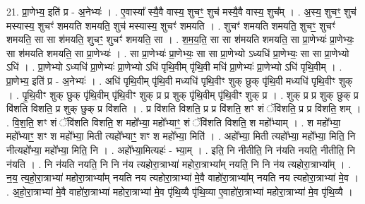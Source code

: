 \documentclass[17pt]{extarticle}
\begin{document}
21. प्रा॒णेभ्य॒ इति॑ प्र - अ॒नेभ्यः॑ । . ए॒वास्या᳚ स्यै॒वै वास्य॒ शुचꣳ॒॒ शुच॑ मस्यै॒वै वास्य॒ शुच᳚म् । . अ॒स्य॒ शुचꣳ॒॒ शुच॑ मस्यास्य॒ शुचꣳ॑ शमयति शमयति॒ शुच॑ मस्यास्य॒ शुचꣳ॑ शमयति । . शुचꣳ॑ शमयति शमयति॒ शुचꣳ॒॒ शुचꣳ॑ शमयति॒ सा सा श॑मयति॒ शुचꣳ॒॒ शुचꣳ॑ शमयति॒ सा । . श॒म॒य॒ति॒ सा सा श॑मयति शमयति॒ सा प्रा॒णेभ्यः॑ प्रा॒णेभ्यः॒ सा श॑मयति शमयति॒ सा प्रा॒णेभ्यः॑ । . सा प्रा॒णेभ्यः॑ प्रा॒णेभ्यः॒ सा सा प्रा॒णेभ्यो ऽध्यधि॑ प्रा॒णेभ्यः॒ सा सा प्रा॒णेभ्यो ऽधि॑ । . प्रा॒णेभ्यो ऽध्यधि॑ प्रा॒णेभ्यः॑ प्रा॒णेभ्यो ऽधि॑ पृथि॒वीम् पृ॑थि॒वी मधि॑ प्रा॒णेभ्यः॑ प्रा॒णेभ्यो ऽधि॑ पृथि॒वीम् । . प्रा॒णेभ्य॒ इति॑ प्र - अ॒नेभ्यः॑ । . अधि॑ पृथि॒वीम् पृ॑थि॒वी मध्यधि॑ पृथि॒वीꣳ शुक् छुक् पृ॑थि॒वी मध्यधि॑ पृथि॒वीꣳ शुक् । . पृ॒थि॒वीꣳ शुक् छुक् पृ॑थि॒वीम् पृ॑थि॒वीꣳ शुक् प्र प्र शुक् पृ॑थि॒वीम् पृ॑थि॒वीꣳ शुक् प्र । . शुक् प्र प्र शुक् छुक् प्र वि॑शति विशति॒ प्र शुक् छुक् प्र वि॑शति । . प्र वि॑शति विशति॒ प्र प्र वि॑शति॒ शꣳ शं ॅवि॑शति॒ प्र प्र वि॑शति॒ शम् । . वि॒श॒ति॒ शꣳ शं ॅवि॑शति विशति॒ श महो᳚भ्या॒ महो᳚भ्याꣳ॒॒ शं ॅवि॑शति विशति॒ श महो᳚भ्याम् । . श महो᳚भ्या॒ महो᳚भ्याꣳ॒॒ शꣳ श महो᳚भ्या॒ मिती त्यहो᳚भ्याꣳ॒॒ शꣳ श महो᳚भ्या॒ मिति॑ । . अहो᳚भ्या॒ मिती त्यहो᳚भ्या॒ महो᳚भ्या॒ मिति॒ नि नीत्यहो᳚भ्या॒ महो᳚भ्या॒ मिति॒ नि । . अहो᳚भ्या॒मित्यहः॑ - भ्या॒म् । . इति॒ नि नीतीति॒ नि न॑यति नयति॒ नीतीति॒ नि न॑यति । . नि न॑यति नयति॒ नि नि न॑य त्यहोरा॒त्राभ्या॑ महोरा॒त्राभ्या᳚म् नयति॒ नि नि न॑य त्यहोरा॒त्राभ्या᳚म् । . न॒य॒ त्य॒हो॒रा॒त्राभ्या॑ महोरा॒त्राभ्या᳚म् नयति नय त्यहोरा॒त्राभ्या॑ मे॒वै वाहो॑रा॒त्राभ्या᳚म् नयति नय त्यहोरा॒त्राभ्या॑ मे॒व । . अ॒हो॒रा॒त्राभ्या॑ मे॒वै वाहो॑रा॒त्राभ्या॑ महोरा॒त्राभ्या॑ मे॒व पृ॑थि॒व्यै पृ॑थि॒व्या ए॒वाहो॑रा॒त्राभ्या॑ महोरा॒त्राभ्या॑ मे॒व पृ॑थि॒व्यै । \newline
\end{document}
